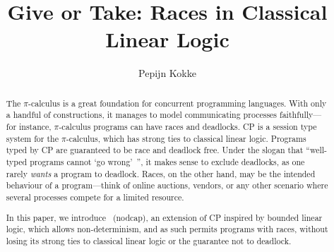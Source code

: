 \documentclass[a4paper,UKenglish]{lipics-v2016}
\title{Give or Take: Races in Classical Linear Logic}%
\author[1]{Pepijn Kokke}%
\affil[1]{LFCS, University of Edinburgh, Edinburgh, United Kingdom\\
  \texttt{pepijn.kokke@ed.ac.uk}}%
\begin{document}
\maketitle

\begin{abstract}
  The $\pi$-calculus is a great foundation for concurrent programming languages.
  With only a handful of constructions, it manages to model communicating
  processes faithfully---for instance, $\pi$-calculus programs can have races
  and deadlocks.
  CP is a session type system for the $\pi$-calculus, which has strong ties to
  classical linear logic. Programs typed by CP are guaranteed to be race and
  deadlock free.
  Under the slogan that ``well-typed programs cannot `go wrong'\!~'', it makes
  sense to exclude deadlocks, as one rarely \emph{wants} a program to deadlock. 
  Races, on the other hand, may be the intended behaviour of a program---think
  of online auctions, vendors, or any other scenario where several processes
  compete for a limited resource.

  In this paper, we introduce \nodcap\ (nodcap), an extension of CP inspired by
  bounded linear logic, which allows non-determinism, and as
  such permits programs with races, without losing its strong ties to classical
  linear logic or the guarantee not to deadlock. 
\end{abstract}
\end{document}
